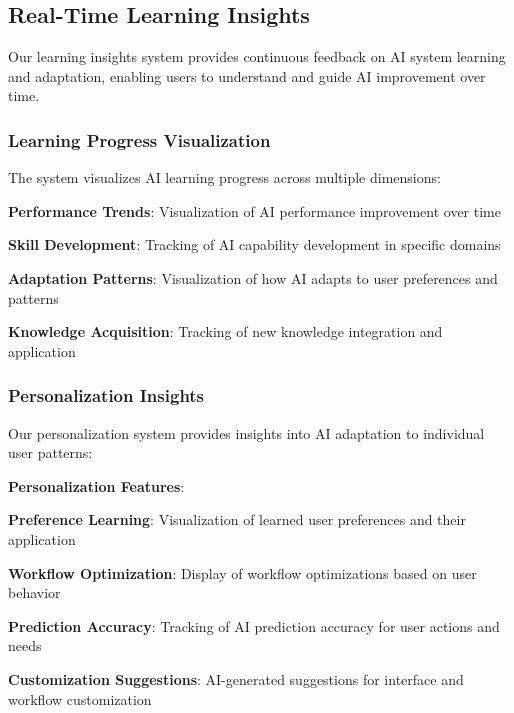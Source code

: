 \subsection*{Real-Time Learning Insights}

Our learning insights system provides continuous feedback on AI system learning and adaptation, enabling users to understand and guide AI improvement over time.

\subsubsection*{Learning Progress Visualization}

The system visualizes AI learning progress across multiple dimensions:

\begin{compactlist}
    \item \textbf{Performance Trends}: Visualization of AI performance improvement over time
    \item \textbf{Skill Development}: Tracking of AI capability development in specific domains
    \item \textbf{Adaptation Patterns}: Visualization of how AI adapts to user preferences and patterns
    \item \textbf{Knowledge Acquisition}: Tracking of new knowledge integration and application
\end{compactlist}

\subsubsection*{Personalization Insights}

Our personalization system provides insights into AI adaptation to individual user patterns:

\begin{successbox}
\textbf{Personalization Features}:
\begin{compactlist}
    \item \textbf{Preference Learning}: Visualization of learned user preferences and their application
    \item \textbf{Workflow Optimization}: Display of workflow optimizations based on user behavior
    \item \textbf{Prediction Accuracy}: Tracking of AI prediction accuracy for user actions and needs
    \item \textbf{Customization Suggestions}: AI-generated suggestions for interface and workflow customization
\end{compactlist}
\end{successbox}

